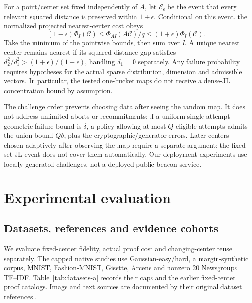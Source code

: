 \documentclass[5p,times,twocolumn]{elsarticle}
\theoremstyle{plain}
\theoremstyle{definition}
\theoremstyle{remark}
\begin{document}
\par\endgroup
\begingroup\color{RevisionRed}
For a point/center set fixed independently of $A$, let $\mathcal E_\epsilon$ be the event that every relevant squared distance is preserved within $1\pm\epsilon$. Conditional on this event, the normalized projected nearest-center cost obeys
\begin{equation}
(1-\epsilon)\Phi_I(\mathcal C)\le
\Phi_{AI}(A\mathcal C)/q\le(1+\epsilon)\Phi_I(\mathcal C).
\end{equation}
Take the minimum of the pointwise bounds, then sum over $I$. A unique nearest center remains nearest if its squared-distance gap satisfies $d_2^2/d_1^2>(1+\epsilon)/(1-\epsilon)$, handling $d_1=0$ separately. Any failure probability requires hypotheses for the actual sparse distribution, dimension and admissible vectors. In particular, the tested one-bucket maps do not receive a dense-JL concentration bound by assumption.


\par\endgroup
\begingroup\color{RevisionRed}
The challenge order prevents choosing data after seeing the random map. It does not address unlimited aborts or recommitments: if a uniform single-attempt geometric failure bound is $\delta$, a policy allowing at most $Q$ eligible attempts admits the union bound $Q\delta$, plus the cryptographic/generator errors. Later centers chosen adaptively after observing the map require a separate argument; the fixed-set JL event does not cover them automatically. Our deployment experiments use locally generated challenges, not a deployed public beacon service.


\par\endgroup


\section{\textcolor{RevisionRed}{Experimental evaluation}}\label{sec:method}
\subsection{\textcolor{RevisionRed}{Datasets, references and evidence cohorts}}
\begingroup\color{RevisionRed}
We evaluate fixed-center fidelity, actual proof cost and changing-center reuse separately. The capped native studies use Gaussian-easy/hard, a margin-synthetic corpus, MNIST, Fashion-MNIST, Gisette, Arcene and nonzero 20 Newsgroups TF--IDF. Table~\ref{tab:datasets-a} records their caps and the earlier fixed-center proof catalogs. Image and text sources are documented by their original dataset references \cite{lecun1998,fashion2017,gisette2004,arcene2004,news20data}.
\end{document}
